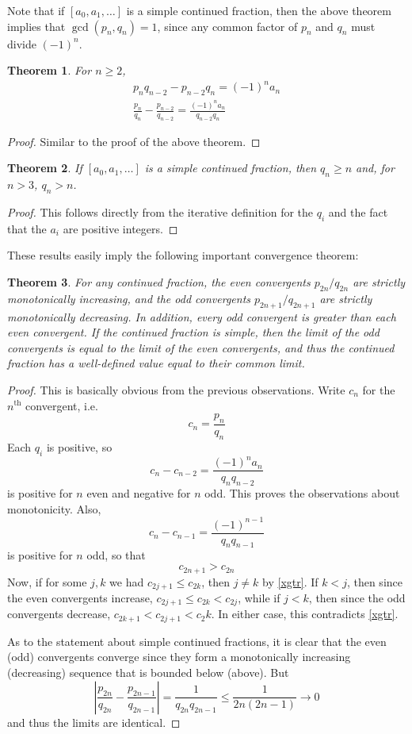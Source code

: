 \documentclass[12pt]{article}
\newtheorem{thm}{Theorem}
\theoremstyle{definition}
\begin{document}
Note that if $[a_0,a_1,\ldots]$ is a simple continued fraction, then the above theorem implies that $\gcd(p_n,q_n)=1$, since any common factor of $p_n$ and $q_n$ must divide $(-1)^n$.

\begin{thm} For $n\geq 2$,
\begin{gather}
\label{pnqnm2}p_nq_{n-2}-p_{n-2}q_n=(-1)^n a_n\\
\label{pnqn2}\frac{p_n}{q_n}-\frac{p_{n-2}}{q_{n-2}}=\frac{(-1)^na_n}{q_{n-2}q_n}
\end{gather}
\end{thm}
\begin{proof} Similar to the proof of the above theorem.
\end{proof}

\begin{thm} If $[a_0,a_1,\ldots]$ is a simple continued fraction, then $q_n\geq n$ and, for $n>3$, $q_n>n$.
\end{thm}
\begin{proof} This follows directly from the iterative definition for the $q_i$ and the fact that the $a_i$ are positive integers.
\end{proof}

These results easily imply the following important convergence theorem:
\begin{thm} For any continued fraction, the even convergents $p_{2n}/q_{2n}$ are strictly monotonically increasing, and the odd convergents $p_{2n+1}/q_{2n+1}$ are strictly monotonically decreasing. In addition, every odd convergent is greater than each even convergent. If the continued fraction is simple, then the limit of the odd convergents is equal to the limit of the even convergents, and thus the continued fraction has a well-defined value equal to their common limit.
\end{thm}
\begin{proof} This is basically obvious from the previous observations. Write $c_n$ for the $n^{\mathrm{th}}$ convergent, i.e.
\[c_n=\frac{p_n}{q_n}\]
Each $q_i$ is positive, so
\[c_n-c_{n-2}=\frac{(-1)^na_n}{q_nq_{n-2}}\]
is positive for $n$ even and negative for $n$ odd. This proves the observations about monotonicity. Also,
\[c_n-c_{n-1}=\frac{(-1)^{n-1}}{q_nq_{n-1}}\]
is positive for $n$ odd, so that
\begin{equation}\label{xgtr}c_{2n+1}>c_{2n}\end{equation}
Now, if for some $j,k$ we had $c_{2j+1}\leq c_{2k}$, then $j\neq k$ by \eqref{xgtr}. If $k<j$, then since the even convergents increase, $c_{2j+1}\leq c_{2k}<c_{2j}$, while if $j<k$, then since the odd convergents decrease, $c_{2k+1}<c_{2j+1}<c_2k$. In either case, this contradicts \eqref{xgtr}.

As to the statement about simple continued fractions, it is clear that the even (odd) convergents converge since they form a monotonically increasing (decreasing) sequence that is bounded below (above). But
\[\left\lvert\frac{p_{2n}}{q_{2n}}-\frac{p_{2n-1}}{q_{2n-1}}\right\rvert=\frac{1}{q_{2n}q_{2n-1}}\leq \frac{1}{2n(2n-1)}\to 0\]
and thus the limits are identical.
\end{proof}
\end{document}
